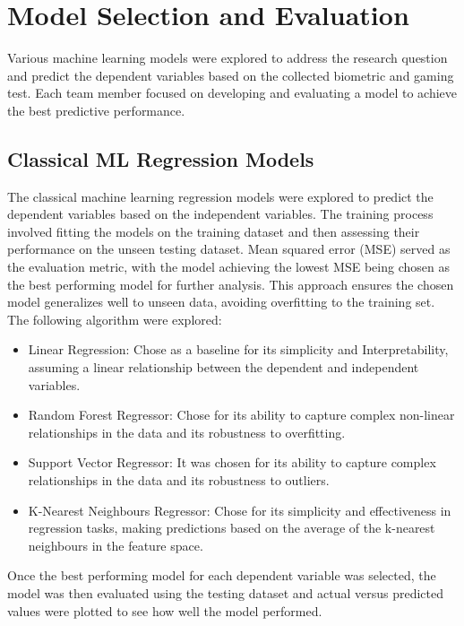 \section{Model Selection and Evaluation}
Various machine learning models were explored to address the research question and predict the dependent variables based on the collected biometric and gaming test. Each team member
focused on developing and evaluating a model to achieve the best predictive performance. 

\subsection{Classical ML Regression Models}
The classical machine learning regression models were explored to predict the dependent variables based on the independent variables. 
The training process involved fitting the models on the training dataset and then assessing their performance on the unseen testing dataset. Mean squared error (MSE) served as the evaluation metric,
with the model achieving the lowest MSE being chosen as the best performing model for further analysis. This approach ensures the chosen model generalizes well to unseen data, avoiding
overfitting to the training set. The following algorithm were explored:

\begin{itemize}
    \item Linear Regression: Chose as a baseline for its simplicity and Interpretability, assuming a linear relationship between the dependent and independent variables.
    \item Random Forest Regressor: Chose for its ability to capture complex non-linear relationships in the data and its robustness to overfitting.
    \item Support Vector Regressor: It was chosen for its ability to capture complex relationships in the data and its robustness to outliers.
    \item K-Nearest Neighbours Regressor: Chose for its simplicity and effectiveness in regression tasks, making predictions based on the average of the k-nearest neighbours in the feature space.
\end{itemize}

Once the best performing model for each dependent variable was selected, the model was then evaluated using the testing dataset and actual versus predicted values were plotted to see
how well the model performed. 

